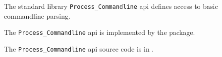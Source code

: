 
The standard library {\tt Process\_Commandline} api defines access to basic commandline parsing.

The {\tt Process\_Commandline} api is implemented by the  package.

The {\tt Process\_Commandline} api source code is in .





